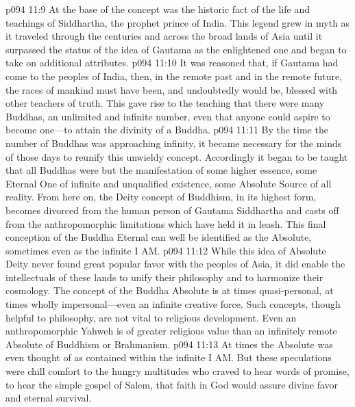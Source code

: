 \pc \vs p094 11:9 \bibnobreakspace {} At the base of the concept was the historic fact of the life and teachings of Siddhartha, the prophet prince of India. This legend grew in myth as it traveled through the centuries and across the broad lands of Asia until it surpassed the status of the idea of Gautama as the enlightened one and began to take on additional attributes.
\pc \vs p094 11:10 \bibnobreakspace {} It was reasoned that, if Gautama had come to the peoples of India, then, in the remote past and in the remote future, the races of mankind must have been, and undoubtedly would be, blessed with other teachers of truth. This gave rise to the teaching that there were many Buddhas, an unlimited and infinite number, even that anyone could aspire to become one---to attain the divinity of a Buddha.
\pc \vs p094 11:11 \bibnobreakspace {} By the time the number of Buddhas was approaching infinity, it became necessary for the minds of those days to reunify this unwieldy concept. Accordingly it began to be taught that all Buddhas were but the manifestation of some higher essence, some Eternal One of infinite and unqualified existence, some Absolute Source of all reality. From here on, the Deity concept of Buddhism, in its highest form, becomes divorced from the human person of Gautama Siddhartha and casts off from the anthropomorphic limitations which have held it in leash. This final conception of the Buddha Eternal can well be identified as the Absolute, sometimes even as the infinite I AM.
\pc \vs p094 11:12 While this idea of Absolute Deity never found great popular favor with the peoples of Asia, it did enable the intellectuals of these lands to unify their philosophy and to harmonize their cosmology. The concept of the Buddha Absolute is at times quasi\hyp{}personal, at times wholly impersonal---even an infinite creative force. Such concepts, though helpful to philosophy, are not vital to religious development. Even an anthropomorphic Yahweh is of greater religious value than an infinitely remote Absolute of Buddhism or Brahmanism.
\vs p094 11:13 At times the Absolute was even thought of as contained within the infinite I AM. But these speculations were chill comfort to the hungry multitudes who craved to hear words of promise, to hear the simple gospel of Salem, that faith in God would assure divine favor and eternal survival.
